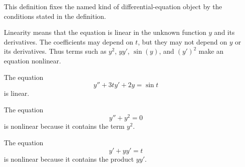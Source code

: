 \begin{remark*}
This definition fixes the named kind of differential-equation object by the
conditions stated in the definition.
\end{remark*}

\NoLocalDependencies

\begin{remark*}[Interpretation]
Linearity means that the equation is linear in the unknown function $y$ and its derivatives. The coefficients may depend on $t$, but they may not depend on $y$ or its derivatives. Thus terms such as $y^2$, $yy'$, $\sin(y)$, and $(y')^2$ make an equation nonlinear.
\end{remark*}

\begin{example*}
The equation
\[
y''+3t y'+2y=\sin t
\]
is linear.

The equation
\[
y''+y^2=0
\]
is nonlinear because it contains the term $y^2$.

The equation
\[
y'+yy'=t
\]
is nonlinear because it contains the product $yy'$.
\end{example*}
